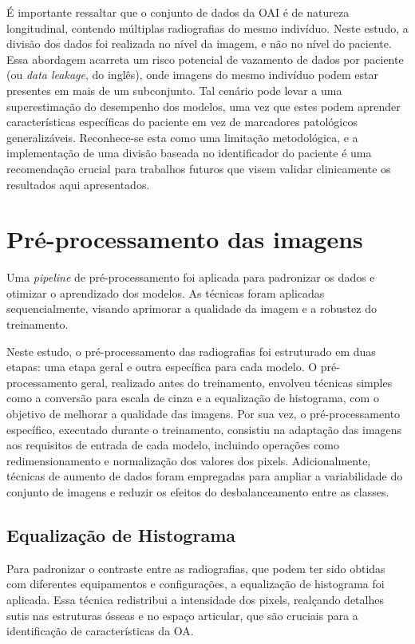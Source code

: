 É importante ressaltar que o conjunto de dados da OAI é de natureza longitudinal, contendo múltiplas radiografias do mesmo indivíduo. Neste estudo, a divisão dos dados foi realizada no nível da imagem, e não no nível do paciente. Essa abordagem acarreta um risco potencial de vazamento de dados por paciente (ou \textit{data leakage}, do inglês), onde imagens do mesmo indivíduo podem estar presentes em mais de um subconjunto. Tal cenário pode levar a uma superestimação do desempenho dos modelos, uma vez que estes podem aprender características específicas do paciente em vez de marcadores patológicos generalizáveis. Reconhece-se esta como uma limitação metodológica, e a implementação de uma divisão baseada no identificador do paciente é uma recomendação crucial para trabalhos futuros que visem validar clinicamente os resultados aqui apresentados.

\section{Pré-processamento das imagens}

Uma \textit{pipeline} de pré-processamento foi aplicada para padronizar os dados e otimizar o aprendizado dos modelos. As técnicas foram aplicadas sequencialmente, visando aprimorar a qualidade da imagem e a robustez do treinamento.

Neste estudo, o pré-processamento das radiografias foi estruturado em duas etapas: uma etapa geral e outra específica para cada modelo. O pré-processamento geral, realizado antes do treinamento, envolveu técnicas simples como a conversão para escala de cinza e a equalização de histograma, com o objetivo de melhorar a qualidade das imagens. Por sua vez, o pré-processamento específico, executado durante o treinamento, consistiu na adaptação das imagens aos requisitos de entrada de cada modelo, incluindo operações como redimensionamento e normalização dos valores dos pixels. Adicionalmente, técnicas de aumento de dados foram empregadas para ampliar a variabilidade do conjunto de imagens e reduzir os efeitos do desbalanceamento entre as classes.

\subsection{Equalização de Histograma}

Para padronizar o contraste entre as radiografias, que podem ter sido obtidas com diferentes equipamentos e configurações, a equalização de histograma foi aplicada. Essa técnica redistribui a intensidade dos pixels, realçando detalhes sutis nas estruturas ósseas e no espaço articular, que são cruciais para a identificação de características da OA.

